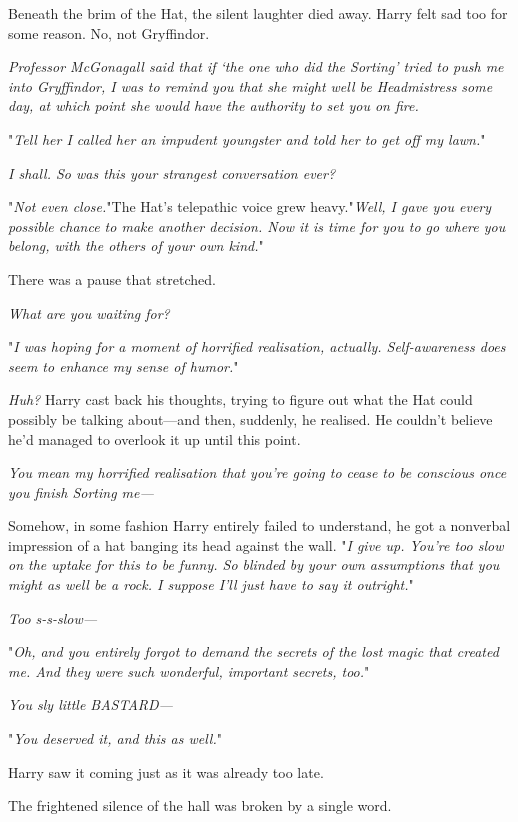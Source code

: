 Beneath the brim of the Hat, the silent laughter died away. Harry felt sad too
for some reason. No, not Gryffindor.

\emph{Professor McGonagall said that if `the one who did the Sorting' tried to
push me into Gryffindor, I was to remind you that she might well be
Headmistress some day, at which point she would have the authority to set you on
fire.}

"\emph{Tell her I called her an impudent youngster and told her to get off my
lawn.}"

\emph{I shall. So was this your strangest conversation ever?}

"\emph{Not even close.}"The Hat's telepathic voice grew heavy."\emph{Well, I
gave you every possible chance to make another decision. Now it is time for you
to go where you belong, with the others of your own kind.}"

There was a pause that stretched.

\emph{What are you waiting for?}

"\emph{I was hoping for a moment of horrified realisation, actually.
Self-awareness does seem to enhance my sense of humor.}"

\emph{Huh?} Harry cast back his thoughts, trying to figure out what the Hat
could possibly be talking about---and then, suddenly, he realised. He couldn't
believe he'd managed to overlook it up until this point.

\emph{You mean my horrified realisation that you're going to cease to be
conscious once you finish Sorting me---}

Somehow, in some fashion Harry entirely failed to understand, he got a
nonverbal impression of a hat banging its head against the wall. "\emph{I give
up. You're too slow on the uptake for this to be funny. So blinded by your own
assumptions that you might as well be a rock. I suppose I'll just have to say
it outright.}"

\emph{Too s-s-slow---}

"\emph{Oh, and you entirely forgot to demand the secrets of the lost magic that
created me. And they were such wonderful, important secrets, too.}"

\emph{You sly little BASTARD---}

"\emph{You deserved it, and this as well.}"

Harry saw it coming just as it was already too late.

The frightened silence of the hall was broken by a single word.

